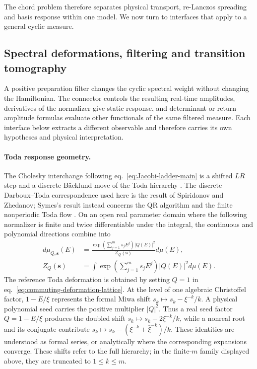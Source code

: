 \documentclass[a4paper,11pt]{article}
\def\dd{d}%
\theoremstyle{definition}
\theoremstyle{remark}
\newcommand{\dd}{\mathrm d}
\begin{document}
The chord problem therefore separates physical transport, re-Lanczos spreading and basis
response within one model.  We now turn to interfaces that apply to a general cyclic measure.

\subsection{Spectral deformations, filtering and transition tomography}
\label{subsec:spectral-response-context}
\label{subsec:toda-context}
\label{subsec:recursion-context}
\label{subsec:determinant-context}
\label{subsec:loschmidt-context}

A positive preparation filter changes the cyclic spectral weight without changing the
Hamiltonian.  The connector controls the resulting real-time amplitudes, derivatives of the
normalizer give static response, and determinant or return-amplitude formulas evaluate other
functionals of the same filtered measure.  Each interface below extracts a different observable
and therefore carries its own hypotheses and physical interpretation.

\paragraph{Toda response geometry.}
The Cholesky interchange following eq.~\eqref{eq:Jacobi-ladder-main} is a shifted $LR$ step and a
discrete B\"acklund move of the Toda hierarchy
\cite{SpiridonovZhedanov1995}. The discrete Darboux--Toda correspondence used here is the result of Spiridonov and Zhedanov; Symes's result instead concerns the QR algorithm and the finite nonperiodic Toda flow \cite{Symes1982}. On an open real parameter domain where the following
normalizer is finite and twice differentiable under the integral, the continuous and polynomial
directions combine into
\begin{equation}
\begin{aligned}
   \dd\mu_{Q,\boldsymbol s}(E)
   &=\frac{\exp(\sum_{j=1}^{m}s_jE^j)|Q(E)|^2}
           {Z_Q(\boldsymbol s)}\dd\mu(E),\\
   Z_Q(\boldsymbol s)
   &=\int\exp\!\left(\sum_{j=1}^{m}s_jE^j\right)|Q(E)|^2\dd\mu(E).
\end{aligned}
   \label{eq:commuting-deformation-lattice}
\end{equation}
The reference Toda deformation is obtained by setting $Q=1$ in eq.~\eqref{eq:commuting-deformation-lattice}.  
At the level of one algebraic Christoffel factor, $1-E/\xi$ represents the formal Miwa shift
$s_k\mapsto s_k-\xi^{-k}/k$.  A physical polynomial seed carries the positive multiplier
$|Q|^2$.  Thus a real seed factor $Q=1-E/\xi$ produces the doubled shift
$s_k\mapsto s_k-2\xi^{-k}/k$, while a nonreal root and its conjugate contribute
$s_k\mapsto s_k-(\xi^{-k}+\bar\xi^{-k})/k$.  These identities are understood as formal series, or
analytically where the corresponding expansions converge.
These shifts refer to the full hierarchy; in the finite-$m$ family displayed above, they are truncated to $1\le k\le m$.
\end{document}
